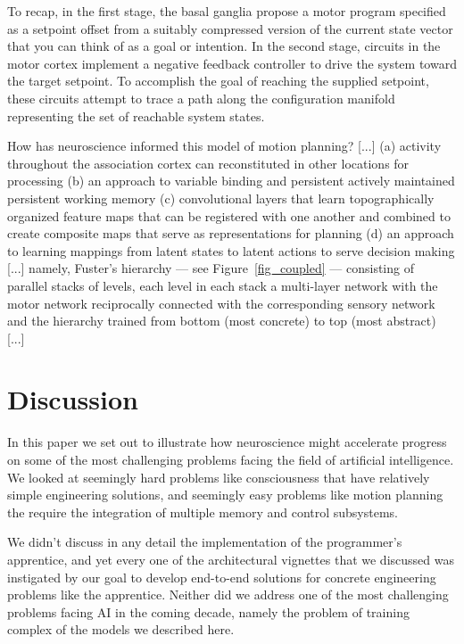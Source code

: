 \documentclass[letterpaper,11pt]{article}
\def\urlh#1{{}}
\def\emdash{---}
\begin{document}
To recap, in the first stage, the basal ganglia propose a motor program specified as a setpoint offset from a suitably compressed version of the current state vector that you can think of as a goal or intention. In the second stage, circuits in the motor cortex implement a negative feedback controller to drive the system toward the target setpoint. To accomplish the goal of reaching the supplied setpoint, these circuits attempt to trace a path along the configuration manifold representing the set of reachable system states.


How has neuroscience informed this model of motion planning? [...] (a) activity throughout the association cortex can reconstituted in other locations for processing (b) an approach to variable binding and persistent actively maintained persistent working memory (c) convolutional layers that learn topographically organized feature maps that can be registered with one another and combined to create composite maps that serve as representations for planning (d) an approach to learning mappings from latent states to latent actions to serve decision making [...] namely, Fuster's hierarchy \emdash{} see Figure~{\urlh{#fig_Coupled_Sensory_Motor_Hierarchy}{\ref{fig_coupled}}} \emdash{} consisting of parallel stacks of levels, each level in each stack a multi-layer network with the motor network reciprocally connected with the corresponding sensory network and the hierarchy trained from bottom (most concrete) to top (most abstract) [...] 

\section{Discussion}

In this paper we set out to illustrate how neuroscience might accelerate progress on some of the most challenging problems facing the field of artificial intelligence. We looked at seemingly hard problems like consciousness that have relatively simple engineering solutions, and seemingly easy problems like motion planning the require the integration of multiple memory and control subsystems.

We didn't discuss in any detail the implementation of the programmer's apprentice, and yet every one of the architectural vignettes that we discussed was instigated by our goal to develop end-to-end solutions for concrete engineering problems like the apprentice. Neither did we address one of the most challenging problems facing AI in the coming decade, namely the problem of training complex of the models we described here.
\end{document}
